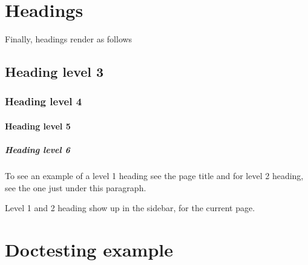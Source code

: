 \section{Headings}



\label{5680510222270408269}{}


Finally, headings render as follows



\subsection{Heading level 3}



\label{13085847155693612023}{}


\subsubsection{Heading level 4}



\label{12782044777122551513}{}


\paragraph{Heading level 5}\indent



\label{9543099701887315540}{}


\subparagraph{Heading level 6}\indent



\label{10897944457118690625}{}


To see an example of a level 1 heading see the page title and for level 2 heading, see the one just under this paragraph.



\begin{tcolorbox}[toptitle=-1mm,bottomtitle=1mm,colback=admonition-note!50!white,colframe=admonition-note,title=\textbf{Headings in sidebars}]
Level 1 and 2 heading show up in the sidebar, for the current page.

\end{tcolorbox}


\section{Doctesting example}



\label{10597583416623881668}{}


